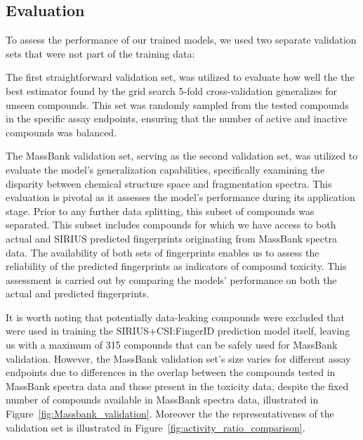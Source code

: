 \subsection{Evaluation}
To assess the performance of our trained models, we used two separate validation sets that were not part of the training data:


The first straightforward validation set, was utilized to evaluate how well the the best estimator found by the grid search 5-fold cross-validation generalizes for unseen compounds. This set was randomly sampled from the tested compounds in the specific assay endpoints, ensuring that the number of active and inactive compounds was balanced.

The MassBank validation set, serving as the second validation set, was utilized to evaluate the model's generalization capabilities, specifically examining the disparity between chemical structure space and fragmentation spectra. This evaluation is pivotal as it assesses the model's performance during its application stage. Prior to any further data splitting, this subset of compounds was separated. This subset includes compounds for which we have access to both actual and SIRIUS predicted fingerprints originating from MassBank spectra data. The availability of both sets of fingerprints enables us to assess the reliability of the predicted fingerprints as indicators of compound toxicity. This assessment is carried out by comparing the models' performance on both the actual and predicted fingerprints.   

It is worth noting that potentially data-leaking compounds were excluded that were used in training the SIRIUS+CSI:FingerID prediction model itself, leaving us with a maximum of 315 compounds that can be safely used for MassBank validation. However, the MassBank validation set's size varies for different assay endpoints due to differences in the overlap between the compounds tested in MassBank spectra data and those present in the toxicity data, despite the fixed number of compounds available in MassBank spectra data, illustrated in Figure~\ref{fig:Massbank_validation}. Moreover the the representativenes of the validation set is illustrated in Figure~\ref{fig:activity_ratio_comparison}.


